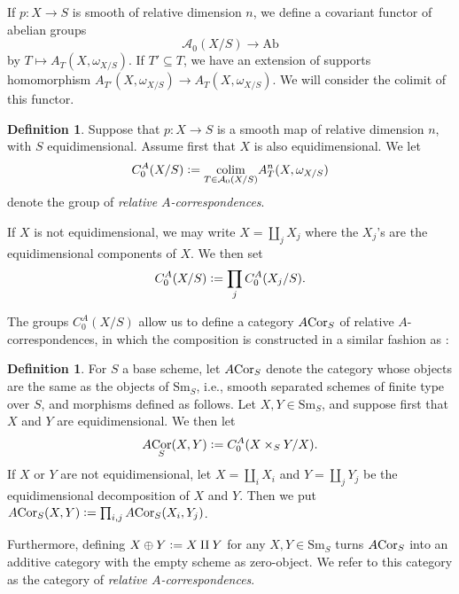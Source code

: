 \documentclass[a4paper, oneside, english,reqno]{amsart}
\theoremstyle{plain}
\theoremstyle{definition}
\newtheorem{definition}[theorem]{Definition}
\theoremstyle{remark}
\newcommand{\defeq}{\vcentcolon=}
\newcommand{\ACor}{A\mkern-3mu\Cor}
\newcommand{\calA}{\mathcal{A}}
\newcommand{\Ab}{\mathrm{Ab}}
\newcommand{\Sm}{\mathrm{Sm}}
\DeclareMathOperator{\Cor}{Cor}
\DeclareMathOperator{\colim}{colim}
\begin{document}
If $p\colon X\to S$ is smooth of relative dimension $n$, we define a covariant functor of abelian groups
\[
\calA_0(X/S)\to\Ab
\]
by $T\mapsto A_T(X,\omega_{X/S})$. If $T'\subseteq T$, we have an extension of supports homomorphism $A_{T'}(X,\omega_{X/S})\to A_{T}(X,\omega_{X/S})$. We will consider the colimit of this functor.

\begin{definition}\label{def:rel}
Suppose that $p\colon X\to S$ is a smooth map of relative dimension $n$, with $S$ equidimensional. Assume first that $X$ is also equidimensional. We let
\[
C^A_0(X/S)\defeq \underset{T\in\calA_0(X/S)}{\colim} A_T^{n}(X,\omega_{X/S})
\]
denote the group of \emph{relative $A$-correspondences}.

If $X$ is not equidimensional, we may write $X=\coprod_j X_j$ where the $X_j$'s are the equidimensional components of $X$. We then set
\[
C^A_0(X/S)\defeq\prod_j C^A_0(X_j/S).
\]
\end{definition}

The groups $C_0^A(X/S)$ allow us to define a category $\ACor_S$ of relative $A$-correspondences, in which the composition is constructed in a similar fashion as \cite{Calmes-Fasel}:

\begin{definition}
For $S$ a base scheme, let $\ACor_S$ denote the category whose objects are the same as the objects of $\Sm_S$, i.e., smooth separated schemes of finite type over $S$, and morphisms defined as follows. Let $X,Y\in\Sm_S$, and suppose first that $X$ and $Y$ are equidimensional. We then let
\[
\ACor_S(X,Y)\defeq C^A_0(X\times_S Y/X).\]
If $X$ or $Y$ are not equidimensional, let $X=\coprod_iX_i$ and $Y=\coprod_jY_j$ be the equidimensional decomposition of $X$ and $Y$. Then we put $\ACor_S(X,Y)\defeq\prod_{i,j}\ACor_S(X_i,Y_j)$.

Furthermore, defining $X\oplus Y\defeq X\amalg Y$ for any $X,Y\in\Sm_S$ turns $\ACor_S$ into an additive category with the empty scheme as zero-object. We refer to this category as the category of \emph{relative $A$-correspondences}.
\end{definition}
\end{document}
